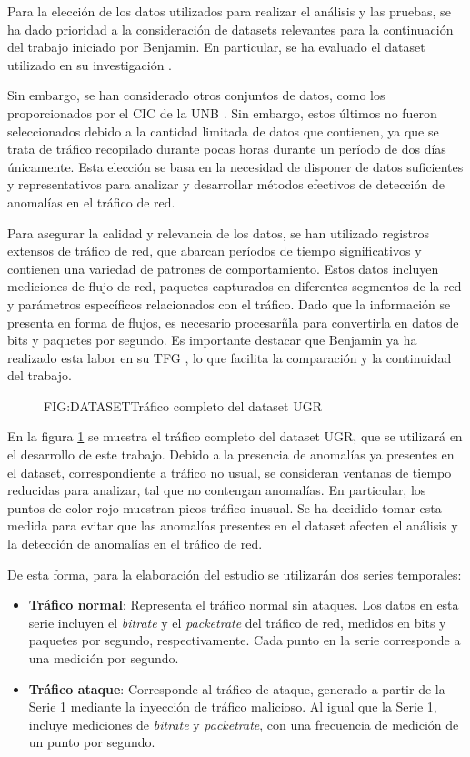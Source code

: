 Para la elección de los datos utilizados para realizar el análisis y las pruebas, se ha dado prioridad a la consideración de datasets relevantes para la continuación del trabajo iniciado por Benjamin. En particular, se ha evaluado el dataset utilizado en su investigación \cite{datosugr16}. 

Sin embargo, se han considerado otros conjuntos de datos, como los proporcionados por el \ac{CIC} de la \ac{UNB} \cite{datosunb19}. Sin embargo, estos últimos no fueron seleccionados debido a la cantidad limitada de datos que contienen, ya que se trata de tráfico recopilado durante pocas horas durante un período de dos días únicamente. Esta elección se basa en la necesidad de disponer de datos suficientes y representativos para analizar y desarrollar métodos efectivos de detección de anomalías en el tráfico de red.

Para asegurar la calidad y relevancia de los datos, se han utilizado registros extensos de tráfico de red, que abarcan períodos de tiempo significativos y contienen una variedad de patrones de comportamiento. Estos datos incluyen mediciones de flujo de red, paquetes capturados en diferentes segmentos de la red y parámetros específicos relacionados con el tráfico. Dado que la información se presenta en forma de flujos, es necesario procesarñla para convertirla en datos de bits y paquetes por segundo.
Es importante destacar que Benjamin ya ha realizado esta labor en su \ac{TFG} \cite{benjamin2021}, lo que facilita la comparación y la continuidad del trabajo.

\begin{figure}[Tráfico completo del dataset UGR]{FIG:DATASET}{Tráfico completo del dataset UGR}
    \label{FIG:DATASET}
\end{figure}

En la figura \ref{FIG:DATASET} se muestra el tráfico completo del dataset UGR, que se utilizará en el desarrollo de este trabajo. Debido a la presencia de anomalías ya presentes en el dataset, correspondiente a tráfico no usual, se consideran ventanas de tiempo reducidas para analizar, tal que no contengan anomalías. En particular, los puntos de color rojo muestran picos tráfico inusual. Se ha decidido tomar esta medida para evitar que las anomalías presentes en el dataset afecten el análisis y la detección de anomalías en el tráfico de red.

De esta forma, para la elaboración del estudio se utilizarán dos series temporales: 
\begin{itemize}
    \item \textbf{Tráfico normal}: Representa el tráfico normal sin ataques. Los datos en esta serie incluyen el \textit{bitrate} y el \textit{packetrate} del tráfico de red, medidos en bits y paquetes por segundo, respectivamente. Cada punto en la serie corresponde a una medición por segundo.
    \item \textbf{Tráfico ataque}: Corresponde al tráfico de ataque, generado a partir de la Serie 1 mediante la inyección de tráfico malicioso. Al igual que la Serie 1, incluye mediciones de \textit{bitrate} y \textit{packetrate}, con una frecuencia de medición de un punto por segundo.
\end{itemize}

